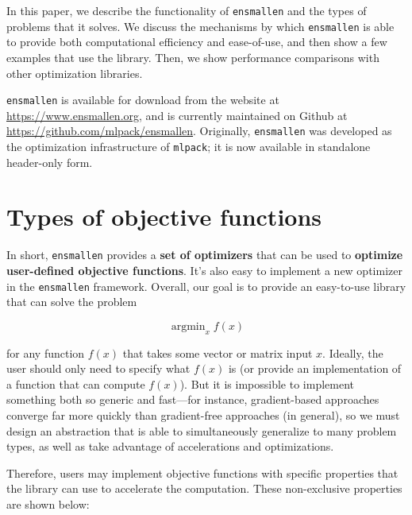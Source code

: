 \documentclass{article}
\begin{document}
In this paper, we describe the functionality of {\tt ensmallen} and the types of
problems that it solves.  We discuss the mechanisms by which {\tt ensmallen} is
able to provide both computational efficiency and ease-of-use, and then show a
few examples that use the library.  Then, we show performance comparisons with
other optimization libraries.

{\tt ensmallen} is available for download from the website at
\url{https://www.ensmallen.org}, and is currently maintained on Github at
\url{https://github.com/mlpack/ensmallen}.  Originally, {\tt ensmallen} was
developed as the optimization infrastructure of {\tt mlpack}; %
it is now available in standalone header-only form.

\section{Types of objective functions}

In short, {\tt ensmallen} provides a {\bf set of optimizers} that can be used to
{\bf optimize user-defined objective functions}.  It's also easy to implement a
new optimizer in the {\tt ensmallen} framework.  Overall, our goal is to provide
an easy-to-use library that can solve the problem

\begin{equation}
\operatorname{argmin}_{x} f(x)
\end{equation}

\noindent for any function $f(x)$ that takes some vector or matrix input $x$.  Ideally,
the user should only need to specify what $f(x)$ is (or provide an
implementation of a function that can compute $f(x)$).  But it is impossible to
implement something both so generic and fast---for instance, gradient-based
approaches converge far more quickly than gradient-free approaches (in general),
so we must design an abstraction that is able to simultaneously generalize to
many problem types, as well as take advantage of accelerations and
optimizations.

Therefore, users may implement objective functions with specific properties that
the library can use to accelerate the computation.  These non-exclusive
properties are shown below:
\end{document}
